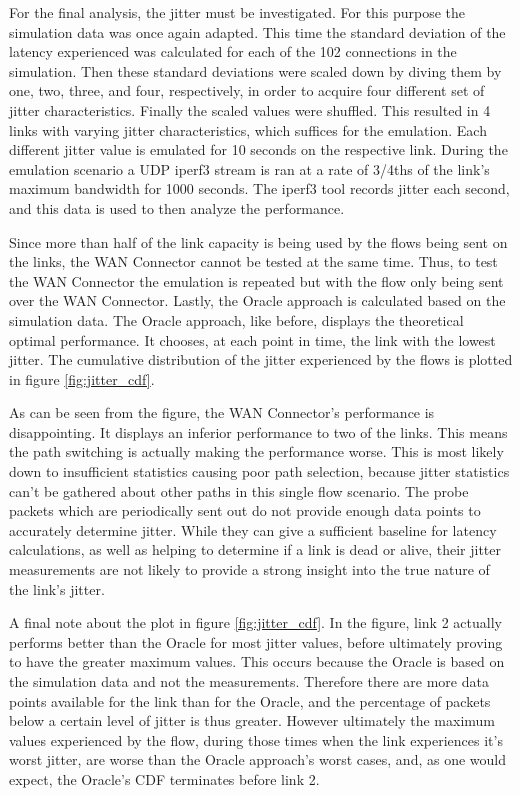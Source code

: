 For the final analysis, the jitter must be investigated. For this purpose the simulation data was once again adapted. This time the standard deviation of the latency experienced was calculated for each of the 102 connections in the simulation. Then these standard deviations were scaled down by diving them by one, two, three, and four, respectively, in order to acquire four different set of jitter characteristics. Finally the scaled values were shuffled. This resulted in 4 links with varying jitter characteristics, which suffices for the emulation. Each different jitter value is emulated for 10 seconds on the respective link. During the emulation scenario a UDP iperf3 stream is ran at a rate of 3/4ths of the link's maximum bandwidth for 1000 seconds. The iperf3 tool records jitter each second, and this data is used to then analyze the performance.

Since more than half of the link capacity is being used by the flows being sent on the links, the WAN Connector cannot be tested at the same time. Thus, to test the WAN Connector the emulation is repeated but with the flow only being sent over the WAN Connector. Lastly, the Oracle approach is calculated based on the simulation data. The Oracle approach, like before, displays the theoretical optimal performance. It chooses, at each point in time, the link with the lowest jitter. The cumulative distribution of the jitter experienced by the flows is plotted in figure \ref{fig:jitter_cdf}.

As can be seen from the figure, the WAN Connector's performance is disappointing. It displays an inferior performance to two of the links. This means the path switching is actually making the performance worse. This is most likely down to insufficient statistics causing poor path selection, because jitter statistics can't be gathered about other paths in this single flow scenario. The probe packets which are periodically sent out do not provide enough data points to accurately determine jitter. While they can give a sufficient baseline for latency calculations, as well as helping to determine if a link is dead or alive, their jitter measurements are not likely to provide a strong insight into the true nature of the link's jitter.

A final note about the plot in figure \ref{fig:jitter_cdf}. In the figure, link 2 actually performs better than the Oracle for most jitter values, before ultimately proving to have the greater maximum values. This occurs because the Oracle is based on the simulation data and not the measurements. Therefore there are more data points available for the link than for the Oracle, and the percentage of packets below a certain level of jitter is thus greater. However ultimately the maximum values experienced by the flow, during those times when the link experiences it's worst jitter, are worse than the Oracle approach's worst cases, and, as one would expect, the Oracle's CDF terminates before link 2.


